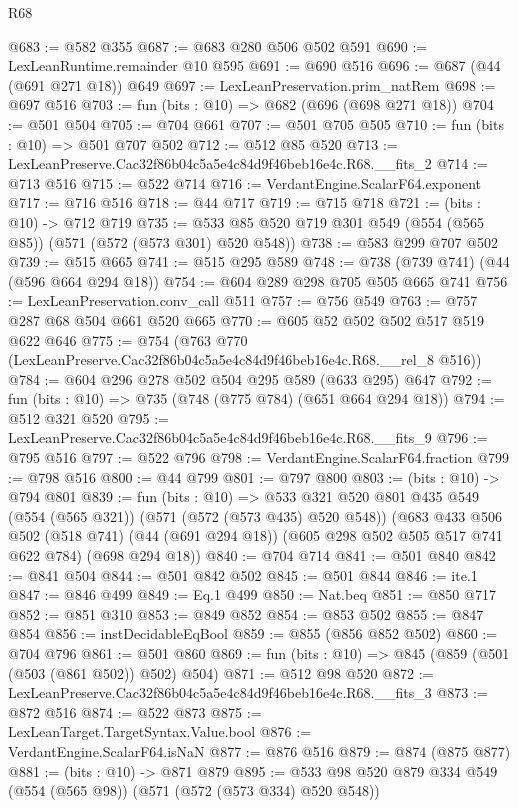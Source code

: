 \begin{lexlean}{R68}
\begin{coremodule}
@683 := @582 @355
@687 := @683 @280 @506 @502 @591
@690 := LexLeanRuntime.remainder @10 @595
@691 := @690 @516
@696 := @687 (@44 (@691 @271 @18)) @649
@697 := LexLeanPreservation.prim_natRem
@698 := @697 @516
@703 := fun (bits : @10) => @682 (@696 (@698 @271 @18))
@704 := @501 @504
@705 := @704 @661
@707 := @501 @705 @505
@710 := fun (bits : @10) => @501 @707 @502
@712 := @512 @85 @520
@713 := LexLeanPreserve.Cac32f86b04c5a5e4c84d9f46beb16e4c.R68.__fits_2
@714 := @713 @516
@715 := @522 @714
@716 := VerdantEngine.ScalarF64.exponent
@717 := @716 @516
@718 := @44 @717
@719 := @715 @718
@721 := (bits : @10) -> @712 @719
@735 := @533 @85 @520 @719 @301 @549 (@554 (@565 @85)) (@571 (@572 (@573 @301) @520 @548))
@738 := @583 @299 @707 @502
@739 := @515 @665
@741 := @515 @295 @589
@748 := @738 (@739 @741) (@44 (@596 @664 @294 @18))
@754 := @604 @289 @298 @705 @505 @665 @741
@756 := LexLeanPreservation.conv_call @511
@757 := @756 @549
@763 := @757 @287 @68 @504 @661 @520 @665
@770 := @605 @52 @502 @502 @517 @519 @622 @646
@775 := @754 (@763 @770 (LexLeanPreserve.Cac32f86b04c5a5e4c84d9f46beb16e4c.R68.__rel_8 @516))
@784 := @604 @296 @278 @502 @504 @295 @589 (@633 @295) @647
@792 := fun (bits : @10) => @735 (@748 (@775 @784) (@651 @664 @294 @18))
@794 := @512 @321 @520
@795 := LexLeanPreserve.Cac32f86b04c5a5e4c84d9f46beb16e4c.R68.__fits_9
@796 := @795 @516
@797 := @522 @796
@798 := VerdantEngine.ScalarF64.fraction
@799 := @798 @516
@800 := @44 @799
@801 := @797 @800
@803 := (bits : @10) -> @794 @801
@839 := fun (bits : @10) =>
  @533
    @321
    @520
    @801
    @435
    @549
    (@554 (@565 @321))
    (@571 (@572 (@573 @435) @520 @548))
    (@683
      @433
      @506
      @502
      (@518 @741)
      (@44 (@691 @294 @18))
      (@605 @298 @502 @505 @517 @741 @622 @784)
      (@698 @294 @18))
@840 := @704 @714
@841 := @501 @840
@842 := @841 @504
@844 := @501 @842 @502
@845 := @501 @844
@846 := ite.{1}
@847 := @846 @499
@849 := Eq.{1} @499
@850 := Nat.beq
@851 := @850 @717
@852 := @851 @310
@853 := @849 @852
@854 := @853 @502
@855 := @847 @854
@856 := instDecidableEqBool
@859 := @855 (@856 @852 @502)
@860 := @704 @796
@861 := @501 @860
@869 := fun (bits : @10) => @845 (@859 (@501 (@503 (@861 @502)) @502) @504)
@871 := @512 @98 @520
@872 := LexLeanPreserve.Cac32f86b04c5a5e4c84d9f46beb16e4c.R68.__fits_3
@873 := @872 @516
@874 := @522 @873
@875 := LexLeanTarget.TargetSyntax.Value.bool
@876 := VerdantEngine.ScalarF64.isNaN
@877 := @876 @516
@879 := @874 (@875 @877)
@881 := (bits : @10) -> @871 @879
@895 := @533 @98 @520 @879 @334 @549 (@554 (@565 @98)) (@571 (@572 (@573 @334) @520 @548))

\end{coremodule}
\end{lexlean}
